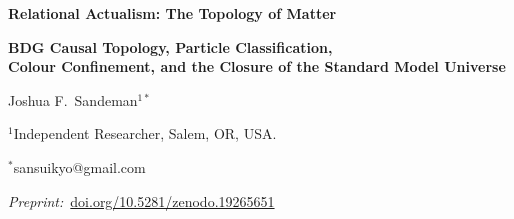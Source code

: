 \documentclass[11pt,a4paper]{article}
\begin{document}
\begin{center}
  {\LARGE\bfseries Relational Actualism: The Topology of Matter\par}
  \vspace{6pt}
  {\large\bfseries BDG Causal Topology, Particle Classification,\\
   Colour Confinement, and the Closure of the Standard Model Universe\par}
  \vspace{14pt}
  {\large Joshua F.\ Sandeman$^{1*}$\par}
  \vspace{4pt}
  {\normalsize $^{1}$Independent Researcher, Salem, OR, USA.\par}
  {\normalsize $^{*}$sansuikyo@gmail.com\par}
  \vspace{8pt}
  {\small\textit{Preprint:}~\href{https://doi.org/10.5281/zenodo.19265651}{doi.org/10.5281/zenodo.19265651}\par}
  \vspace{14pt}
\end{center}
\end{document}
